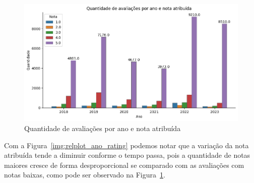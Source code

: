 \begin{figure}
	\centering
	\includegraphics[width=1\textwidth]{figs/exploratoria/quantidade_avaliacao_nota_atribuida_ano.png}
	\caption{Quantidade de avaliações por ano e nota atribuída}
	\label{img:dist_review_rating_per_year}
\end{figure}

Com a Figura~\ref{img:relplot_ano_rating} podemos notar que a variação da nota atribuída tende a diminuir conforme o tempo passa, pois a quantidade de notas maiores cresce de forma desproporcional se comparado com as avaliações com notas baixas, como pode ser observado na Figura~\ref{img:dist_review_rating_per_year}.


